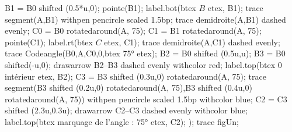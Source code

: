 \begin{changemargin}{0mm}{-20mm}
\begin{methode}
\begin{Geometrie}[CoinHD={(8.5u,5u)}]
                B1 = B0 shifted (0.5*u,0);
                pointe(B1);
                label.bot(btex $B$ etex, B1);
                trace segment(A,B1) withpen pencircle scaled 1.5bp;
                trace demidroite(A,B1) dashed evenly;
                C0 = B0 rotatedaround(A, 75);
                C1 = B1 rotatedaround(A, 75);
                pointe(C1);
                label.rt(btex $C$ etex, C1);
                trace demidroite(A,C1) dashed evenly;
                trace Codeangle(B0,A,C0,0,btex \ang{75} etex);
                B2 = B0 shifted (0.5u,u);
                B3 = B0 shifted(-u,0);
                drawarrow B2--B3 dashed evenly withcolor red;
                label.top(btex {\red $0$ intérieur} etex, B2);
                C3 = B3 shifted (0.3u,0) rotatedaround(A, 75);
                trace segment(B3 shifted (0.2u,0) rotatedaround(A, 75),B3 shifted (0.4u,0) rotatedaround(A, 75)) withpen pencircle scaled 1.5bp withcolor blue;
                C2 = C3 shifted (2.3u,0.3u);
                drawarrow C2--C3 dashed evenly withcolor blue;
                label.top(btex {\blue marquage de l'angle : \ang{75}} etex, C2);
            );
            trace figUn;
        \end{Geometrie}        
    \end{methode}
\end{changemargin}
\vspace*{-21mm}
